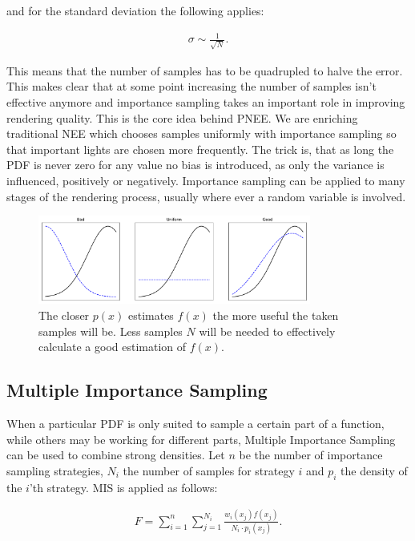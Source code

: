 and for the standard deviation the following applies:

\begin{align}
 \sigma \sim \frac{1}{\sqrt{N}}.
\end{align}

This means that the number of samples has to be quadrupled to halve the error. This makes clear that at some point increasing the number of samples isn't effective anymore and importance sampling takes an important role in improving rendering quality. This is the core idea behind PNEE. We are enriching traditional NEE which chooses samples uniformly with importance sampling so that important lights are chosen more frequently. The trick is, that as long the PDF is never zero for any value no bias is introduced, as only the variance is influenced, positively or negatively. Importance sampling can be applied to many stages of the rendering process, usually where ever a random variable is involved. 


\begin{figure}
    \centering
    \includegraphics[width=0.8\textwidth]{figures/plots/importancesampling.pdf}
    \caption{The closer $p(x)$ estimates $f(x)$ the more useful the taken samples will be. Less samples $N$ will be needed to effectively calculate a good estimation of $f(x)$.   }
    \label{fig:importancesample}
\end{figure}

\subsection{Multiple Importance Sampling}

When a particular PDF is only suited to sample a certain part of a function, while others may be working for different parts, Multiple Importance Sampling can be used to combine strong densities. Let $n$ be the number of importance sampling strategies, $N_i$ the number of samples for strategy $i$ and $p_i$ the density of the $i$'th strategy. MIS is applied as follows:

\begin{align}
F = \sum_{i=1}^{n}\sum_{j=1}^{N_i}\frac{w_i(x_j)f(x_j)}{N_i \cdot p_i(x_j)}.
\label{eq:mis}
\end{align}

